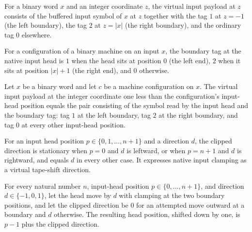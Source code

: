 \begin{definition}
\label{Complexity.inputPayload}
\leanok
{}
For a binary word $x$ and an integer coordinate $z$, the virtual input payload at $z$
consists of the buffered input symbol of $x$ at $z$ together with the tag $1$ at
$z = -1$ (the left boundary), the tag $2$ at $z = |x|$ (the right boundary), and the
ordinary tag $0$ elsewhere.
\end{definition}

\begin{definition}
\label{Complexity.inputTag}
\leanok
{}
For a configuration of a binary machine on an input $x$, the boundary tag at the
native input head is $1$ when the head sits at position $0$ (the left end), $2$ when
it sits at position $|x| + 1$ (the right end), and $0$ otherwise.
\end{definition}

\begin{lemma}
\label{Complexity.inputPayload_head}
\leanok
{}
Let $x$ be a binary word and let $c$ be a machine configuration on $x$. The virtual
input payload at the integer coordinate one less than the configuration's input-head
position equals the pair consisting of the symbol read by the input head and the
boundary tag: tag $1$ at the left boundary, tag $2$ at the right boundary, and tag $0$
at every other input-head position.
\end{lemma}

\begin{definition}
\label{Complexity.clippedMove}
\leanok
For an input head position $p \in \{0, 1, \dots, n+1\}$ and a direction $d$, the
clipped direction is stationary when $p = 0$ and $d$ is leftward, or when $p = n + 1$
and $d$ is rightward, and equals $d$ in every other case.  It expresses native input
clamping as a virtual tape-shift direction.
\end{definition}

\begin{lemma}
\label{Complexity.clippedMove_correct}
\leanok
{}
For every natural number $n$, input-head position $p\in\{0,\ldots,n+1\}$, and direction
$d\in\{-1,0,1\}$, let the head move by $d$ with clamping at the two boundary positions,
and let the clipped direction be $0$ for an attempted move outward at a boundary and $d$
otherwise. The resulting head position, shifted down by one, is $p-1$ plus the clipped
direction.
\end{lemma}

